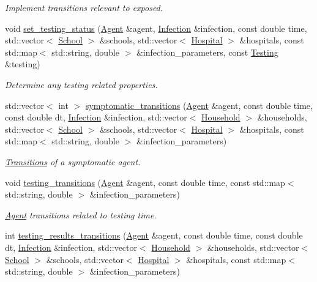 \begin{DoxyCompactItemize}
\begin{DoxyCompactList}\small\item\em Implement transitions relevant to exposed. \end{DoxyCompactList}\item 
void \hyperlink{classHspEmployeeTransitions_a26f775b16217102ab60ccc8f32218f15}{set\+\_\+testing\+\_\+status} (\hyperlink{classAgent}{Agent} \&agent, \hyperlink{classInfection}{Infection} \&infection, const double time, std\+::vector$<$ \hyperlink{classSchool}{School} $>$ \&schools, std\+::vector$<$ \hyperlink{classHospital}{Hospital} $>$ \&hospitals, const std\+::map$<$ std\+::string, double $>$ \&infection\+\_\+parameters, const \hyperlink{classTesting}{Testing} \&testing)
\begin{DoxyCompactList}\small\item\em Determine any testing related properties. \end{DoxyCompactList}\item 
std\+::vector$<$ int $>$ \hyperlink{classHspEmployeeTransitions_a5620e353a3d778cb12f3259addaca7d5}{symptomatic\+\_\+transitions} (\hyperlink{classAgent}{Agent} \&agent, const double time, const double dt, \hyperlink{classInfection}{Infection} \&infection, std\+::vector$<$ \hyperlink{classHousehold}{Household} $>$ \&households, std\+::vector$<$ \hyperlink{classSchool}{School} $>$ \&schools, std\+::vector$<$ \hyperlink{classHospital}{Hospital} $>$ \&hospitals, const std\+::map$<$ std\+::string, double $>$ \&infection\+\_\+parameters)
\begin{DoxyCompactList}\small\item\em \hyperlink{classTransitions}{Transitions} of a symptomatic agent. \end{DoxyCompactList}\item 
void \hyperlink{classHspEmployeeTransitions_ad306607b72bc170b8ac557d0483ecd14}{testing\+\_\+transitions} (\hyperlink{classAgent}{Agent} \&agent, const double time, const std\+::map$<$ std\+::string, double $>$ \&infection\+\_\+parameters)
\begin{DoxyCompactList}\small\item\em \hyperlink{classAgent}{Agent} transitions related to testing time. \end{DoxyCompactList}\item 
int \hyperlink{classHspEmployeeTransitions_a6312d9d477fcd78d5b38a654c59a473e}{testing\+\_\+results\+\_\+transitions} (\hyperlink{classAgent}{Agent} \&agent, const double time, const double dt, \hyperlink{classInfection}{Infection} \&infection, std\+::vector$<$ \hyperlink{classHousehold}{Household} $>$ \&households, std\+::vector$<$ \hyperlink{classSchool}{School} $>$ \&schools, std\+::vector$<$ \hyperlink{classHospital}{Hospital} $>$ \&hospitals, const std\+::map$<$ std\+::string, double $>$ \&infection\+\_\+parameters)

\end{DoxyCompactItemize}

